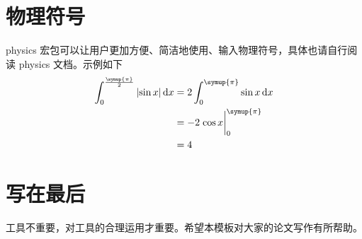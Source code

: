 \section{物理符号}
physics 宏包可以让用户更加方便、简洁地使用、输入物理符号，具体也请自行阅读 physics 文档。示例如下
\begin{equation}
  \begin{aligned}
    \int_0^\frac{\symup{\pi}}{2} \abs{\sin{x}} \dd{x} & = 2 \int_0^{\symup{\pi}} \sin{x} \dd{x} \\
                                                      & = -2 \eval{\cos{x}}_0^{\symup{\pi}}     \\
                                                      & = 4
  \end{aligned}
\end{equation}

\section{写在最后}
工具不重要，对工具的合理运用才重要。希望本模板对大家的论文写作有所帮助。
